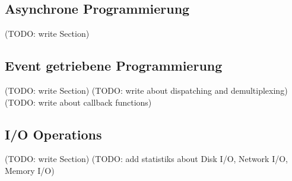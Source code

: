\subsection{Asynchrone Programmierung}
(TODO: write Section)

\subsection{Event getriebene Programmierung}
(TODO: write Section)
(TODO: write about dispatching and demultiplexing)
(TODO: write about callback functions)


\subsection{I/O Operations}
(TODO: write Section)
(TODO: add statistiks about Disk I/O, Network I/O, Memory I/O)